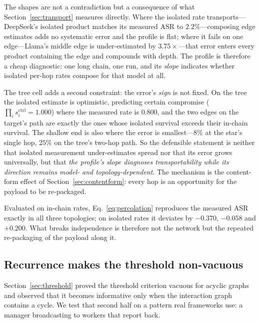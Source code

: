 \documentclass[sigconf,anonymous]{aamas}
\newcommand{\scite}[1]{\ensuremath{s^{\mathrm{ctrl}}_{#1}}}
\begin{document}
The shapes are not a contradiction but a consequence of what
Section~\ref{sec:transport} measures directly. Where the isolated rate
transports---DeepSeek's isolated product matches its measured ASR to $2.2\%$---composing
edge estimates adds no systematic error and the profile is flat; where it fails on
one edge---Llama's middle edge is under-estimated by $3.75\times$---that error enters
every product containing the edge and compounds with depth. The profile is therefore
a cheap diagnostic: one long chain, one run, and its \emph{slope} indicates whether
isolated per-hop rates compose for that model at all.

The tree cell adds a second constraint: the error's \emph{sign} is not fixed. On
the tree the isolated estimate is optimistic, predicting certain compromise
($\prod_i \scite{i} = 1.000$) where the measured rate is $0.800$, and the two edges
on the target's path are exactly the ones whose isolated survival exceeds their
in-chain survival. The shallow end is also where the error is smallest---$8\%$ at
the star's single hop, $25\%$ on the tree's two-hop path. So the defensible
statement is neither that isolated measurement under-estimates spread nor that its
error grows universally, but that
\emph{the profile's slope diagnoses transportability while its direction remains
model- and topology-dependent}. The mechanism is the content-form effect of
Section~\ref{sec:contentform}: every hop is an opportunity for the payload to be
re-packaged.

Evaluated on in-chain rates, Eq.~\eqref{eq:percolation} reproduces the measured ASR
exactly in all three topologies; on isolated rates it deviates by $-0.370$, $-0.058$
and $+0.200$. What breaks independence is therefore not the network but the repeated
re-packaging of the payload along it.

\subsection{Recurrence makes the threshold non-vacuous}
\label{sec:cyclic}

Section~\ref{sec:threshold} proved the threshold criterion vacuous for acyclic
graphs and observed that it becomes informative only when the interaction graph
contains a cycle. We test that second half on a pattern real frameworks use: a
manager broadcasting to workers that report back.
\end{document}
